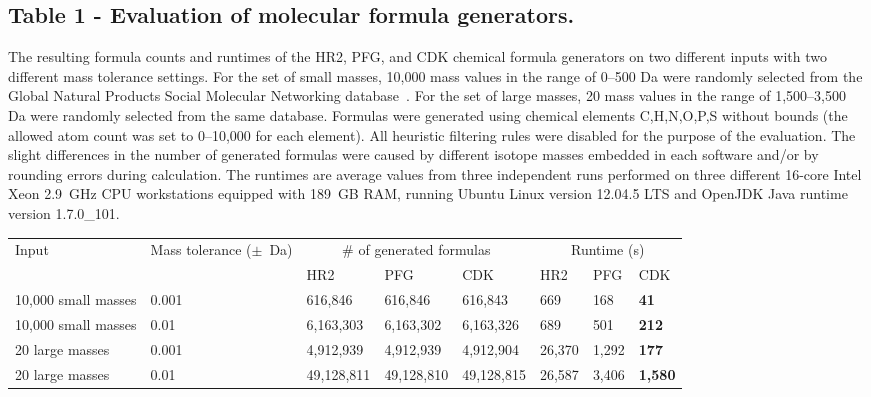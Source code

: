\documentclass[10pt]{bmcart}
\begin{document}
\begin{backmatter}
  \subsection*{Table 1 - Evaluation of molecular formula generators.}
  \label{tab:formula_generators}
  The resulting formula counts and runtimes of the HR2, PFG, and CDK chemical
formula generators on two different inputs with two different mass tolerance
settings. For the set of small masses, 10,000 mass values in the range of
0--500 Da were randomly selected from the Global Natural Products Social
Molecular Networking database~\cite{wang2016}. For the set of large masses, 20
mass values in the range of 1,500--3,500 Da were randomly selected from the same
database. Formulas were generated using chemical elements C,H,N,O,P,S without
bounds (the allowed atom count was set to 0--10,000 for each element). All
heuristic filtering rules were disabled for the purpose of the evaluation. The
slight differences in the number of generated formulas were caused by different
isotope masses embedded in each software and/or by rounding errors during
calculation. The runtimes are average values from three independent runs
performed on three different 16-core Intel Xeon 2.9~GHz CPU workstations
equipped with 189~GB RAM, running Ubuntu Linux version 12.04.5 LTS and OpenJDK
Java runtime version 1.7.0\_101.
  \baselineskip

    \begin{minipage}{1\textwidth}
    \centering
    \begin{tabular}{llllllll}
	\multirow{2}{1in}{Input} & \multirow{2}{1in}{Mass tolerance ($\pm$~Da)} & \multicolumn{3}{c}{\# of generated formulas} & \multicolumn{3}{c}{Runtime (s)} \\
	& & HR2 & PFG & CDK & HR2 & PFG & CDK \\
	10,000 small masses & 0.001 & 616,846 & 616,846 & 616,843 & 669 & 168 & \textbf{41} \\
	10,000 small masses & 0.01 & 6,163,303 & 6,163,302 & 6,163,326 & 689 & 501 & \textbf{212} \\
	20 large masses & 0.001 & 4,912,939 & 4,912,939 & 4,912,904 & 26,370 & 1,292 & \textbf{177} \\
	20 large masses & 0.01 & 49,128,811 & 49,128,810 & 49,128,815 & 26,587 & 3,406 & \textbf{1,580} \\
    \end{tabular}
    \end{minipage}


\end{backmatter}
\end{document}
